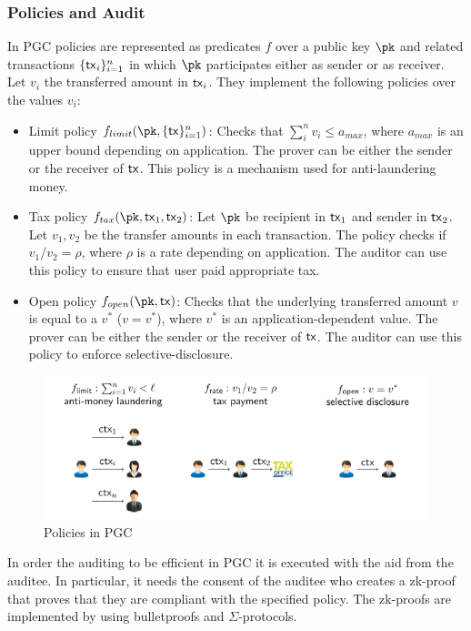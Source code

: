 \subsubsection{Policies and Audit}
In PGC policies are represented as predicates $f$ over a public key $\pk$ and related transactions $\{\textup{\textsf{tx}}_i\}_{i=1}^n$ in which $\pk$ participates either as sender or as receiver. Let $v_i$ the transferred amount in $\textup{\textsf{tx}}_i$. They implement the following policies over the values $v_i$:
\begin{itemize}
    \item Limit policy $f_{limit}(\pk, \{\txn\}_{i=1}^n)$: Checks that $\sum_i^n {v_i} \leq a_{max}$, where $a_{max}$ is an upper bound depending on application. The prover can be either the sender or the receiver of $\textup{\textsf{tx}}$. This policy is a mechanism used for anti-laundering money.
    \item Tax policy $f_{tax}(\pk, \txn_1, \txn_2)$: Let $\pk$ be recipient in $\textup{\textsf{tx}}_1$ and sender in $\textup{\textsf{tx}}_2$. Let $v_1,v_2$ be the transfer amounts in each transaction. The policy checks if $v_1/v_2 = \rho$, where $\rho$ is a rate depending on application. The auditor can use this policy to ensure that user paid appropriate tax.   
    \item Open policy $f_{open}(\pk, \txn)$: Checks that the underlying transferred amount $v$ is equal to a $v^*$ ($v=v^*$), where $v^*$ is an application-dependent value. The prover can be either the sender or the receiver of $\textup{\textsf{tx}}$. The auditor can use this policy to enforce selective-disclosure.
\end{itemize}

\begin{figure}[h]
    \includegraphics[width=\textwidth]{images/pgc/pgc_policies.png}
    \centering
    \caption{Policies in PGC}
\end{figure}


In order the auditing to be efficient in PGC it is executed with the aid from the auditee. In particular, it needs the consent of the auditee who creates a zk-proof that proves that they are compliant with the specified policy. The zk-proofs are implemented by using bulletproofs and $\Sigma$-protocols.

